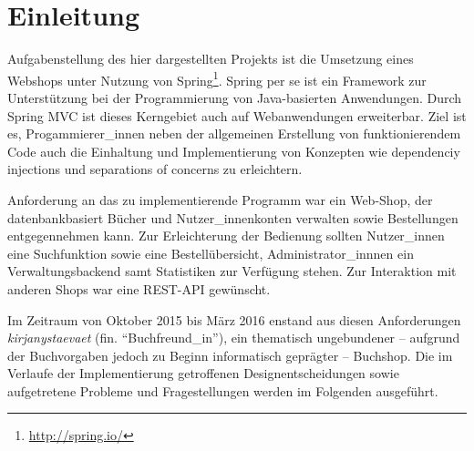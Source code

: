 \section{Einleitung}
	Aufgabenstellung des hier dargestellten Projekts ist die Umsetzung eines Webshops unter Nutzung von Spring\footnote{\hyperlink{http://spring.io/}{http://spring.io/}}. Spring per se ist ein Framework zur Unterstützung bei der Programmierung von Java-basierten Anwendungen. Durch Spring MVC ist dieses Kerngebiet auch auf Webanwendungen erweiterbar. Ziel ist es, Progammierer\_innen neben der allgemeinen Erstellung von funktionierendem Code auch die Einhaltung und Implementierung von Konzepten wie dependenciy injections und separations of concerns zu erleichtern. 
	
	Anforderung an das zu implementierende Programm war ein Web-Shop, der datenbankbasiert Bücher und Nutzer\_innenkonten verwalten sowie Bestellungen entgegennehmen kann. Zur Erleichterung der Bedienung sollten Nutzer\_innen eine Suchfunktion sowie eine Bestellübersicht, Administrator\_innnen ein Verwaltungsbackend samt Statistiken zur Verfügung stehen. Zur Interaktion mit anderen Shops war eine REST-API gewünscht.
	
	Im Zeitraum von Oktober 2015 bis März 2016 enstand aus diesen Anforderungen \textit{kirjanystaevaet} (fin. "`Buchfreund\_in"'), ein thematisch ungebundener -- aufgrund der Buchvorgaben jedoch zu Beginn informatisch geprägter -- Buchshop. Die im Verlaufe der Implementierung getroffenen Designentscheidungen sowie aufgetretene Probleme und Fragestellungen werden im Folgenden ausgeführt. 